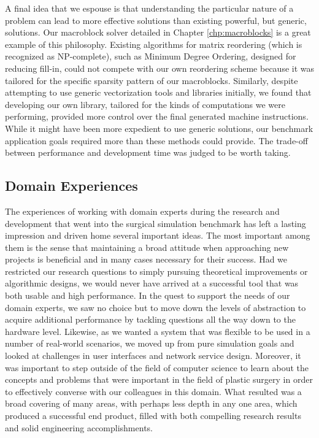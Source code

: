A final idea that we espouse is that understanding the particular
nature of a problem can lead to more effective solutions than existing
powerful, but generic, solutions. Our macroblock solver detailed in
Chapter \ref{chp:macroblocks} is a great example of this
philosophy. Existing algorithms for matrix reordering (which is
recognized as NP-complete), such as Minimum Degree Ordering, designed
for reducing fill-in, could not compete with our own reordering scheme
because it was tailored for the specific sparsity pattern of our
macroblocks. Similarly, despite attempting to use generic
vectorization tools and libraries initially, we found that developing
our own library, tailored for the kinds of computations we were
performing, provided more control over the final generated machine
instructions. While it might have been more expedient to use generic
solutions, our benchmark application goals required more than these
methods could provide. The trade-off between performance and
development time was judged to be worth taking.

\subsection{Domain Experiences}

The experiences of working with domain experts during the research and
development that went into the surgical simulation benchmark has left
a lasting impression and driven home several important ideas. The most
important among them is the sense that maintaining a broad attitude
when approaching new projects is beneficial and in many cases
necessary for their success. Had we restricted our research questions
to simply pursuing theoretical improvements or algorithmic designs, we
would never have arrived at a successful tool that was both usable
and high performance. In the quest to support the needs of our domain
experts, we saw no choice but to move down the levels of abstraction
to acquire additional performance by tackling questions all the way
down to the hardware level. Likewise, as we wanted a system that was
flexible to be used in a number of real-world scenarios, we moved up
from pure simulation goals and looked at challenges in user interfaces
and network service design. Moreover, it was important to step outside
of the field of computer science to learn about the concepts and
problems that were important in the field of plastic surgery in order
to effectively converse with our colleagues in this domain. What
resulted was a broad covering of many areas, with perhaps less depth
in any one area, which produced a successful end product, filled with
both compelling research results and solid engineering accomplishments.

